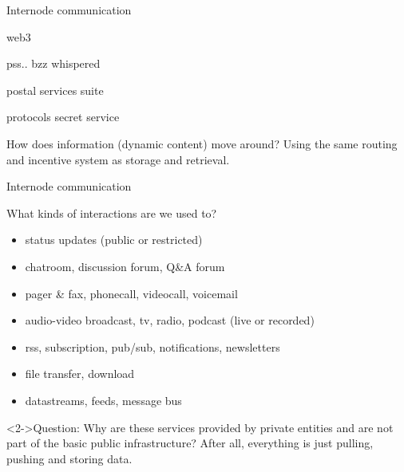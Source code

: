 \documentclass{beamer}
\begin{document}
\begin{section}{Internode communication}




\begin{frame}{web3}
\begin{block}{}
pss..  bzz whispered
\end{block}
\begin{block}{}
postal services suite
\end{block}
\begin{block}{}
protocols secret service
\end{block}
\end{frame}


\begin{frame}
 \begin{block}{How does information (dynamic content) move around?}
 Using the same routing and incentive system as storage and retrieval.
 \end{block}
\end{frame}


\begin{frame}{Internode communication}
\begin{block}{What kinds of interactions are we used to?}
 \begin{itemize}
    \item status updates (public or restricted)
    \item chatroom, discussion forum, Q\&A forum
    \item pager \& fax, phonecall, videocall, voicemail
    \item audio-video broadcast, tv, radio, podcast (live or recorded)
    \item rss, subscription, pub/sub, notifications, newsletters
    \item file transfer, download
    \item datastreams, feeds, message bus
 \end{itemize}
\end{block}
\begin{block}<2->{Question:}
 Why are these services provided by private entities and are not part of the basic public infrastructure? After all, everything is just pulling, pushing and storing data.
\end{block}
\end{frame}


\end{section}
\end{document}
